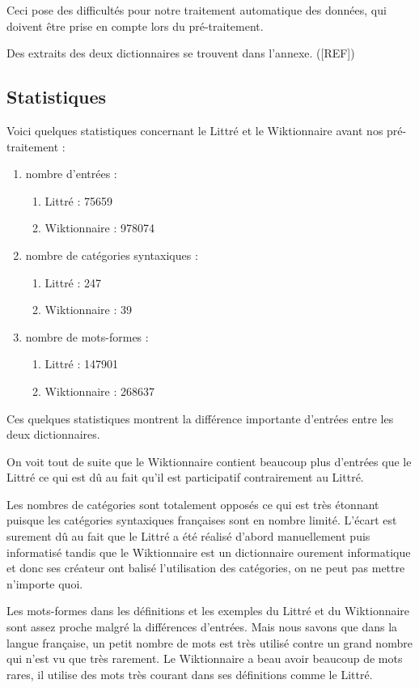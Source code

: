 Ceci pose des difficultés pour notre traitement automatique des données, qui 
doivent être prise en compte lors du pré-traitement.

Des extraits des deux dictionnaires se trouvent dans l'annexe. ([REF])

\subsection{Statistiques}

Voici quelques statistiques concernant le Littré et le Wiktionnaire avant nos 
pré-traitement :

\begin{enumerate}
 \item {nombre d'entrées :
	\begin{enumerate}
	 \item Littré : 75659
	 \item Wiktionnaire : 978074
	\end{enumerate}
	}
 \item {nombre de catégories syntaxiques :
	\begin{enumerate}
	 \item Littré : 247
	 \item Wiktionnaire : 39
	\end{enumerate}
	}
 \item {nombre de mots-formes :
	\begin{enumerate}
	 \item Littré : 147901
	 \item Wiktionnaire : 268637
	\end{enumerate}
	}
\end{enumerate}

Ces quelques statistiques montrent la différence importante d'entrées entre les 
deux dictionnaires.

On voit tout de suite que le Wiktionnaire contient beaucoup plus d'entrées que 
le Littré ce qui est dû au fait qu'il est participatif contrairement au Littré.

Les nombres de catégories sont totalement opposés ce qui est très étonnant 
puisque les catégories syntaxiques françaises sont en nombre limité. L'écart 
est surement dû au fait que le Littré a été réalisé d'abord manuellement puis 
informatisé tandis que le Wiktionnaire est un dictionnaire ourement informatique 
et donc ses créateur ont balisé l'utilisation des catégories, on ne peut pas 
mettre n'importe quoi.

Les mots-formes dans les définitions et les exemples du Littré et du 
Wiktionnaire sont assez proche malgré la différences d'entrées. Mais nous savons 
que dans la langue française, un petit nombre de mots est très utilisé contre 
un grand nombre qui n'est vu que très rarement. Le Wiktionnaire a beau avoir 
beaucoup de mots rares, il utilise des mots très courant dans ses définitions 
comme le Littré.
